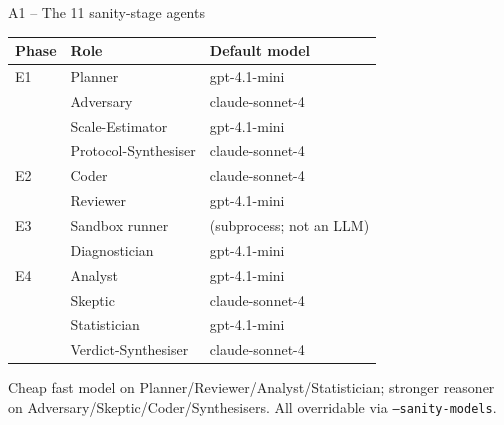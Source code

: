 \documentclass[10pt,aspectratio=169]{beamer}
\newcommand{\flag}[1]{\texttt{\small#1}}
\begin{document}
\begin{frame}{A1 -- The 11 sanity-stage agents}
  \scriptsize
  \begin{tabular}{@{}l l l@{}}
    \toprule
    Phase & Role & Default model \\
    \midrule
    E1 & Planner             & gpt-4.1-mini \\
       & Adversary           & claude-sonnet-4 \\
       & Scale-Estimator     & gpt-4.1-mini \\
       & Protocol-Synthesiser & claude-sonnet-4 \\
    \midrule
    E2 & Coder               & claude-sonnet-4 \\
       & Reviewer            & gpt-4.1-mini \\
    \midrule
    E3 & Sandbox runner      & (subprocess; not an LLM) \\
       & Diagnostician       & gpt-4.1-mini \\
    \midrule
    E4 & Analyst             & gpt-4.1-mini \\
       & Skeptic             & claude-sonnet-4 \\
       & Statistician        & gpt-4.1-mini \\
       & Verdict-Synthesiser & claude-sonnet-4 \\
    \bottomrule
  \end{tabular}

  \vspace{0.5em}
  \footnotesize Cheap fast model on Planner/Reviewer/Analyst/Statistician;
  stronger reasoner on Adversary/Skeptic/Coder/Synthesisers. All overridable via
  \flag{--sanity-models}.
\end{frame}
\end{document}
